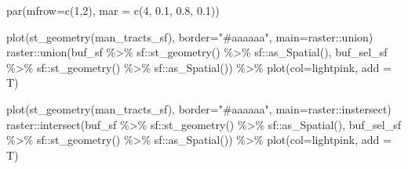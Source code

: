 \documentclass[
  11pt,
]{book}
\newenvironment{Shaded}{\begin{snugshade}}{\end{snugshade}}
\newcommand{\AttributeTok}[1]{\textcolor[rgb]{0.77,0.63,0.00}{#1}}
\newcommand{\DecValTok}[1]{\textcolor[rgb]{0.00,0.00,0.81}{#1}}
\newcommand{\FloatTok}[1]{\textcolor[rgb]{0.00,0.00,0.81}{#1}}
\newcommand{\FunctionTok}[1]{\textcolor[rgb]{0.00,0.00,0.00}{#1}}
\newcommand{\NormalTok}[1]{#1}
\newcommand{\SpecialCharTok}[1]{\textcolor[rgb]{0.00,0.00,0.00}{#1}}
\newcommand{\StringTok}[1]{\textcolor[rgb]{0.31,0.60,0.02}{#1}}
\begin{document}
\begin{Shaded}
\begin{Highlighting}[]
\FunctionTok{par}\NormalTok{(}\AttributeTok{mfrow=}\FunctionTok{c}\NormalTok{(}\DecValTok{1}\NormalTok{,}\DecValTok{2}\NormalTok{), }\AttributeTok{mar =} \FunctionTok{c}\NormalTok{(}\DecValTok{4}\NormalTok{, }\FloatTok{0.1}\NormalTok{, }\FloatTok{0.8}\NormalTok{, }\FloatTok{0.1}\NormalTok{))}

\FunctionTok{plot}\NormalTok{(}\FunctionTok{st\_geometry}\NormalTok{(man\_tracts\_sf), }\AttributeTok{border=}\StringTok{"\#aaaaaa"}\NormalTok{, }\AttributeTok{main=}\StringTok{\textquotesingle{}raster::union\textquotesingle{}}\NormalTok{)}
\NormalTok{raster}\SpecialCharTok{::}\FunctionTok{union}\NormalTok{(buf\_sf }\SpecialCharTok{\%\textgreater{}\%}\NormalTok{ sf}\SpecialCharTok{::}\FunctionTok{st\_geometry}\NormalTok{() }\SpecialCharTok{\%\textgreater{}\%}\NormalTok{ sf}\SpecialCharTok{::}\FunctionTok{as\_Spatial}\NormalTok{(),}
\NormalTok{              buf\_sel\_sf }\SpecialCharTok{\%\textgreater{}\%}\NormalTok{ sf}\SpecialCharTok{::}\FunctionTok{st\_geometry}\NormalTok{() }\SpecialCharTok{\%\textgreater{}\%}\NormalTok{ sf}\SpecialCharTok{::}\FunctionTok{as\_Spatial}\NormalTok{()) }\SpecialCharTok{\%\textgreater{}\%} 
  \FunctionTok{plot}\NormalTok{(}\AttributeTok{col=}\StringTok{\textquotesingle{}lightpink\textquotesingle{}}\NormalTok{, }\AttributeTok{add =}\NormalTok{ T)}
              
\FunctionTok{plot}\NormalTok{(}\FunctionTok{st\_geometry}\NormalTok{(man\_tracts\_sf), }\AttributeTok{border=}\StringTok{"\#aaaaaa"}\NormalTok{, }\AttributeTok{main=}\StringTok{\textquotesingle{}raster::instersect\textquotesingle{}}\NormalTok{)}
\NormalTok{raster}\SpecialCharTok{::}\FunctionTok{intersect}\NormalTok{(buf\_sf }\SpecialCharTok{\%\textgreater{}\%}\NormalTok{ sf}\SpecialCharTok{::}\FunctionTok{st\_geometry}\NormalTok{() }\SpecialCharTok{\%\textgreater{}\%}\NormalTok{ sf}\SpecialCharTok{::}\FunctionTok{as\_Spatial}\NormalTok{(), }
\NormalTok{                  buf\_sel\_sf }\SpecialCharTok{\%\textgreater{}\%}\NormalTok{ sf}\SpecialCharTok{::}\FunctionTok{st\_geometry}\NormalTok{() }\SpecialCharTok{\%\textgreater{}\%}\NormalTok{ sf}\SpecialCharTok{::}\FunctionTok{as\_Spatial}\NormalTok{()) }\SpecialCharTok{\%\textgreater{}\%} 
  \FunctionTok{plot}\NormalTok{(}\AttributeTok{col=}\StringTok{\textquotesingle{}lightpink\textquotesingle{}}\NormalTok{, }\AttributeTok{add =}\NormalTok{ T)}
\end{Highlighting}
\end{Shaded}
\end{document}
